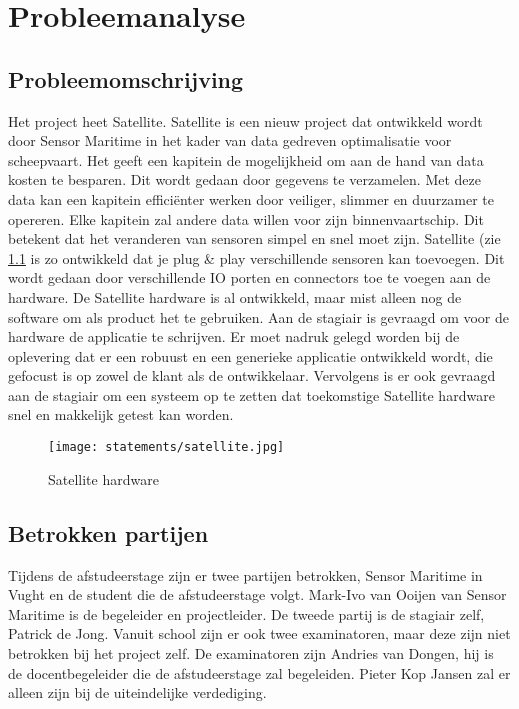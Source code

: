 \chapter{Probleemanalyse}

\section{Probleemomschrijving}
Het project heet Satellite. Satellite is een nieuw project dat ontwikkeld wordt door Sensor Maritime in het kader van data gedreven optimalisatie voor scheepvaart. Het geeft een kapitein de mogelijkheid om aan de hand van data kosten te besparen. Dit wordt gedaan door gegevens te verzamelen. Met deze data kan een kapitein efficiënter werken door veiliger, slimmer en duurzamer te opereren. Elke kapitein zal andere data willen voor zijn binnenvaartschip. Dit betekent dat het veranderen van sensoren simpel en snel moet zijn. Satellite (zie \ref{fig:shw} is zo ontwikkeld dat je plug \& play verschillende sensoren kan toevoegen. Dit wordt gedaan door verschillende IO porten en connectors toe te voegen aan de hardware. De Satellite hardware is al ontwikkeld, maar mist alleen nog de software om als product het te gebruiken. Aan de stagiair is  gevraagd om voor de hardware de applicatie te schrijven. Er moet nadruk gelegd worden bij de oplevering dat er een robuust en een generieke applicatie ontwikkeld wordt, die gefocust is op zowel de klant als de ontwikkelaar. Vervolgens is er ook gevraagd aan de stagiair om een systeem op te zetten dat toekomstige Satellite hardware snel en makkelijk getest kan worden.
\begin{figure}[h!]
	\begin{centering}

	\texttt{[image: statements/satellite.jpg]}
	\caption{Satellite hardware}
	\label{fig:shw}
	\end{centering}
\end{figure}


\section{Betrokken partijen}
Tijdens de afstudeerstage zijn er twee partijen betrokken, Sensor Maritime in Vught en de student die de afstudeerstage volgt. Mark-Ivo van Ooijen van Sensor Maritime is de begeleider en projectleider. De tweede partij is de stagiair zelf, Patrick de Jong. Vanuit school zijn er ook twee examinatoren, maar deze zijn niet betrokken bij het project zelf. De examinatoren zijn Andries van Dongen, hij is de docentbegeleider die de afstudeerstage zal begeleiden. Pieter Kop Jansen zal er alleen zijn bij de uiteindelijke verdediging.

